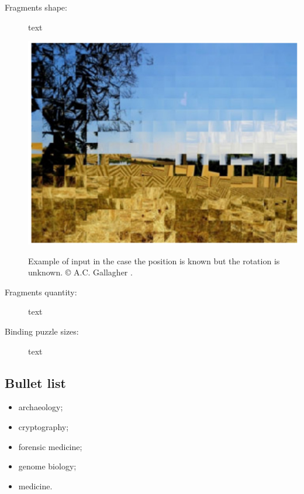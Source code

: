 \begin{description}
    \item[Fragments shape:] text

\begin{marginfigure}[\baselineskip]
    \centering
    \includegraphics[width=\linewidth]{20-prologue/puzzlerotation.jpg}
    \caption[A rotation prediction task]{Example of input in the case the position is known but the rotation is unknown. © A.C. Gallagher \citep{gallagher2012jigsaw}.}
    \label{fig:pstask:rotation}
\end{marginfigure}

    \item[Fragments quantity:] text
    \item[Binding puzzle sizes:] text
\end{description}


\subsection{Bullet list}

\begin{itemize}
    \item archaeology;
    \item cryptography;
    \item forensic medicine;
    \item genome biology;
    \item medicine.
\end{itemize}
